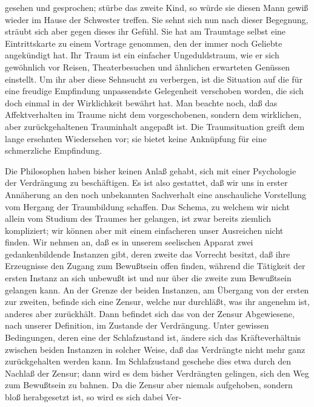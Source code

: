 \documentclass[twoside=true,titlepage=false,open=any, parskip=never, fontsize=10pt, headings=small, chapterprefix=false, appendixprefix=false]{scrbook}
\begin{document}
         
            
            
            
        \pstart
        gesehen und gesprochen; stürbe das zweite Kind, so würde sie diesen
               Mann gewiß wieder im Hause der Schwester treffen. Sie sehnt sich nun nach dieser
               Begegnung, sträubt sich aber gegen dieses ihr Gefühl. Sie hat am Traumtage
               selbst eine Eintrittskarte zu einem Vortrage genommen, den der immer noch
               Geliebte angekündigt hat. Ihr Traum ist ein einfacher Ungeduldstraum,
               wie er sich gewöhnlich vor Reisen, Theaterbesuchen und ähnlichen erwarteten
               Genüssen einstellt. Um ihr aber diese Sehnsucht zu verbergen, ist die Situation
               auf die für eine freudige Empfindung unpassendste Gelegenheit verschoben worden,
               die sich doch einmal in der Wirklichkeit bewährt hat. Man beachte
               noch, daß das Affektverhalten im Traume nicht dem vorgeschobenen, sondern
               dem wirklichen, aber zurückgehaltenen Trauminhalt angepaßt ist. Die
               Traumsituation greift dem lange ersehnten Wiedersehen vor; sie bietet keine
               Anknüpfung für eine schmerzliche Empfindung.
        \pend
    
         
            
            
            \pstart{}\pend
            
        \pstart
        Die Philosophen haben bisher keinen Anlaß gehabt, sich mit einer Psychologie der
               Verdrängung zu beschäftigen. Es ist also gestattet, daß wir uns in erster
               Annäherung an den noch unbekannten Sachverhalt eine anschauliche
               Vorstellung vom Hergang der Traumbildung schaffen. Das Schema, zu welchem wir
               nicht allein vom Studium des Traumes her gelangen, ist zwar bereits
               ziemlich kompliziert; wir können aber mit einem einfacheren unser Ausreichen
               nicht finden. Wir nehmen an, daß es in unserem seelischen Apparat zwei
               gedankenbildende Instanzen gibt, deren zweite das Vorrecht besitzt, daß ihre
               Erzeugnisse den Zugang zum Bewußtsein offen finden, während die Tätigkeit der
               ersten Instanz an sich unbewußt ist und nur über die zweite zum Bewußtsein
               gelangen kann. An der Grenze der beiden Instanzen, am Übergang von
               der ersten zur zweiten, befinde sich eine Zensur, welche nur durchläßt, was ihr
               angenehm ist, anderes aber zurückhält. Dann befindet sich das von der Zensur
               Abgewiesene, nach unserer Definition, im Zustande der Verdrängung. Unter
               gewissen Bedingungen, deren eine der Schlafzustand ist, ändere sich
               das Kräfteverhältnis zwischen beiden Instanzen in solcher Weise, daß
               das Verdrängte nicht mehr ganz zurückgehalten werden kann. Im Schlafzustand
               geschehe dies etwa durch den Nachlaß der Zensur; dann wird es dem bisher
               Verdrängten gelingen, sich den Weg zum Bewußtsein zu bahnen. Da die Zensur aber
               niemals aufgehoben, sondern bloß herabgesetzt ist, so wird es sich
               dabei Ver-
        \pend
    
\end{document}
